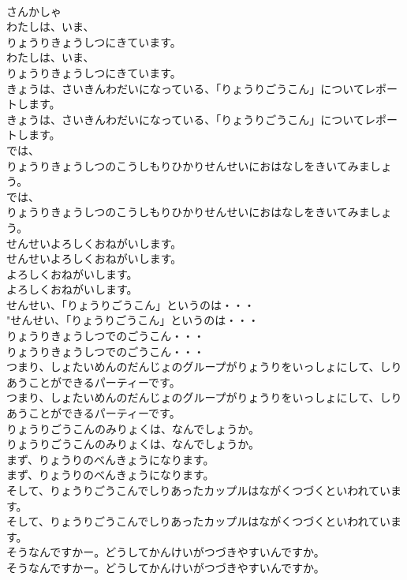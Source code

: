 \documentclass[8pt]{extreport}
\begin{document}
\begin{CJK}{UTF8}{min}
\\	さんかしゃ
\\	わたしは、いま、
\\	りょうりきょうしつにきています。	
\\	わたしは、いま、
\\	りょうりきょうしつにきています。 
\\	きょうは、さいきんわだいになっている、「りょうりごうこん」についてレポートします。	
\\	きょうは、さいきんわだいになっている、「りょうりごうこん」についてレポートします。 
\\	では、
\\	りょうりきょうしつのこうしもりひかりせんせいにおはなしをきいてみましょう。	
\\	では、
\\	りょうりきょうしつのこうしもりひかりせんせいにおはなしをきいてみましょう。 
\\	せんせいよろしくおねがいします。	
\\	せんせいよろしくおねがいします。 
\\	よろしくおねがいします。	
\\	よろしくおねがいします。 
\\	せんせい、「りょうりごうこん」というのは・・・	
\\	"せんせい、「りょうりごうこん」というのは・・・ 
\\	りょうりきょうしつでのごうこん・・・	
\\	りょうりきょうしつでのごうこん・・・ 
\\	つまり、しょたいめんのだんじょのグループがりょうりをいっしょにして、しりあうことができるパーティーです。	
\\	つまり、しょたいめんのだんじょのグループがりょうりをいっしょにして、しりあうことができるパーティーです。 
\\	りょうりごうこんのみりょくは、なんでしょうか。	
\\	りょうりごうこんのみりょくは、なんでしょうか。 
\\	まず、りょうりのべんきょうになります。	
\\	まず、りょうりのべんきょうになります。 
\\	そして、りょうりごうこんでしりあったカップルはながくつづくといわれています。	
\\	そして、りょうりごうこんでしりあったカップルはながくつづくといわれています。 
\\	そうなんですかー。どうしてかんけいがつづきやすいんですか。	
\\	そうなんですかー。どうしてかんけいがつづきやすいんですか。 

\end{CJK}
\end{document}
